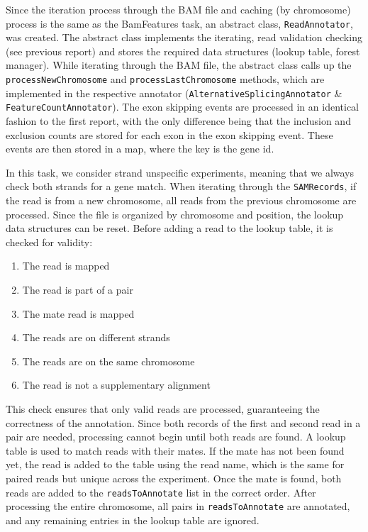 \documentclass{article}
\begin{document}
    Since the iteration process through the BAM file and caching (by chromosome) process is the same as the BamFeatures task, an abstract class, \texttt{ReadAnnotator}, was created. The abstract class implements the iterating, read validation checking (see previous report) and stores the required data structures (lookup table, forest manager). While iterating through the BAM file, the abstract class calls up the \texttt{processNewChromosome} and \texttt{processLastChromosome} methods, which are implemented in the respective annotator (\texttt{AlternativeSplicingAnnotator} \& \texttt{FeatureCountAnnotator}). The exon skipping events are processed in an identical fashion to the first report, with the only difference being that the inclusion and exclusion counts are stored for each exon in the exon skipping event. These events are then stored in a map, where the key is the gene id.

    In this task, we consider strand unspecific experiments, meaning that we always check both strands for a gene match. When iterating through the \texttt{SAMRecords}, if the read is from a new chromosome, all reads from the previous chromosome are processed. Since the file is organized by chromosome and position, the lookup data structures can be reset. Before adding a read to the lookup table, it is checked for validity:
    \begin{enumerate}
        \item The read is mapped
        \item The read is part of a pair
        \item The mate read is mapped
        \item The reads are on different strands
        \item The reads are on the same chromosome
        \item The read is not a supplementary alignment
    \end{enumerate}
    This check ensures that only valid reads are processed, guaranteeing the correctness of the annotation. Since both records of the first and second read in a pair are needed, processing cannot begin until both reads are found. A lookup table is used to match reads with their mates. If the mate has not been found yet, the read is added to the table using the read name, which is the same for paired reads but unique across the experiment. Once the mate is found, both reads are added to the \texttt{readsToAnnotate} list in the correct order. After processing the entire chromosome, all pairs in \texttt{readsToAnnotate} are annotated, and any remaining entries in the lookup table are ignored.
\end{document}

